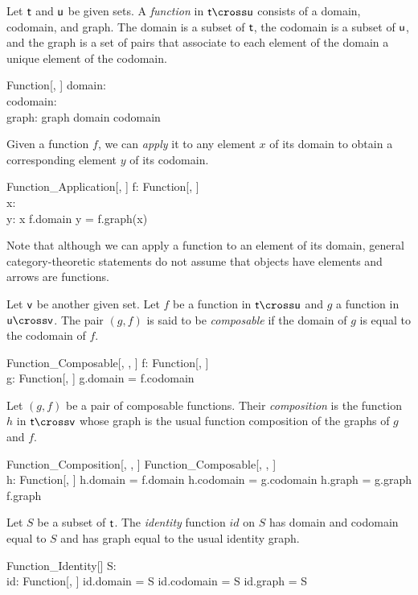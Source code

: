 \documentclass{amsart}
\begin{document}
Let $\mathsf{t}$ and $\mathsf{u}$ be given sets.
A \textit{function} in $\genT \cross \genU$ consists of a domain, codomain, and graph.
The domain is a subset of $\mathsf{t}$, the codomain is a subset of $\mathsf{u}$, and the graph is a set of pairs that 
associate to each element of the domain a unique element of the codomain.
\begin{schema}{Function}[\genT, \genU]
	domain: \power \genT \\
	codomain: \power \genU \\
	graph: \genT \pfun \genU
\where
	graph \in domain \fun codomain
\end{schema}

Given a function $f$, we can \textit{apply} it to any element $x$ of its domain to obtain a corresponding element $y$ of its codomain.
\begin{schema}{Function\_Application}[\genT, \genU]
	f: Function[\genT, \genU] \\
	x: \genT \\
	y: \genU
\where
	x \in f.domain
\also
	y = f.graph(x)
\end{schema}

Note that although we can apply a function to an element of its domain, general category-theoretic statements do not assume that
objects have elements and arrows are functions.

Let $\mathsf{v}$ be another given set. 
Let $f$ be a function in $\genT \cross \genU$
and $g$ a function in $\genU \cross \genV$.
The pair $(g, f)$ is said to be \textit{composable}
if the domain of $g$ is equal to the codomain of $f$.
\begin{schema}{Function\_Composable}[\genT, \genU, \genV]
	f: Function[\genT, \genU] \\
	g: Function[\genU, \genV]
\where
	g.domain = f.codomain
\end{schema}

Let $(g, f)$ be a pair of composable functions. 
Their \textit{composition} is the function $h$ in $\genT \cross \genV$ 
whose graph is the usual function composition of the graphs of $g$ and $f$.
\begin{schema}{Function\_Composition}[\genT, \genU, \genV]
	Function\_Composable[\genT, \genU, \genV] \\
	h: Function[\genT, \genV]
\where
	h.domain = f.domain
\also
	h.codomain = g.codomain
\also
	h.graph = g.graph \circ f.graph
\end{schema}

Let $S$ be a subset of $\mathsf{t}$. The \textit{identity} function $id$ on $S$ has domain and codomain equal to $S$ and has graph equal to the usual
identity graph.
\begin{schema}{Function\_Identity}[\genT]
	S: \power \genT \\
	id: Function[\genT, \genT]
\where
	id.domain = S
\also
	id.codomain = S
\also
	id.graph = \id S
\end{schema}
\end{document}
